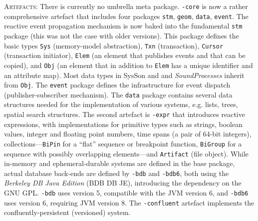 \documentclass[11pt,a4paper]{article}
\newcommand{\software}[1]{\textit{#1}}
\newcommand{\sysson}[0]{SysSon}
\newcommand{\artefacts}[0]{\textsc{Artefacts:}}
\begin{document}
\artefacts{} There is currently no umbrella meta package. \verb!-core! is now a rather comprehensive artefact that includes four packages \verb!stm!, \verb!geom!, \verb!data!, \verb!event!. The reactive event propagation mechanism is now baked into the fundamental \verb!stm! package (this was not the case with older versions). This package defines the basic types \verb!Sys! (memory-model abstraction), \verb!Txn! (transaction), \verb!Cursor! (transaction initiator), \verb!Elem! (an element that publishes events and that can be copied), and \verb!Obj! (an element that in addition to \verb!Elem! has a unique identifier and an attribute map). Most data types in \sysson{} and and \software{SoundProcesses} inherit from \verb!Obj!. The \verb!event! package defines the infrastructure for event dispatch (publisher-subscriber mechanism). The \verb!data! package contains several data structures needed for the implementation of various systems, e.g. lists, trees, spatial search structures. The second artefact is \verb!-expr! that introduces reactive expressions, with implementations for primitive types such as strings, boolean values, integer and floating point numbers, time spans (a pair of 64-bit integers), collections---\verb!BiPin! for a ``flat'' sequence or breakpoint function, \verb!BiGroup! for a sequence with possibly overlapping elements---and \verb!Artifact! (file object). While in-memory and ephemeral-durable systems are defined in the base package, actual database back-ends are defined by \verb!-bdb! and \verb!-bdb6!, both using the \software{Berkeley DB Java Edition} (BDB DB JE), introducing the dependency on the GNU GPL. \verb!-bdb! uses version 5, compatible with the JVM version 6, and \verb!-bdb6! uses version 6, requiring JVM version 8. The \verb!-confluent! artefact implements the confluently-persistent (versioned) system.
\end{document}
